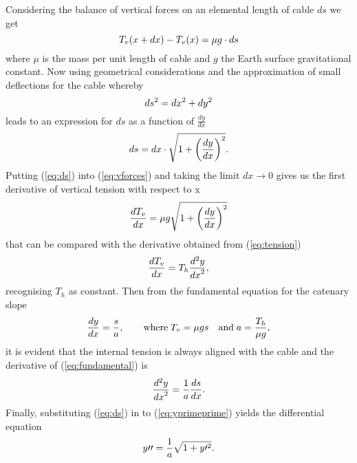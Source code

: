 \documentclass[11pt]{amsart}
\begin{document}
Considering the balance of vertical forces on an elemental length of cable $ds$ we get
\begin{equation}
	\centering
	T_{v}(x+dx) - T_{v}(x) = \mu g \cdot ds
	\label{eq:vforces}
\end{equation}
where $\mu$ is the mass per unit length of cable and $g$ the Earth surface gravitational constant. Now
using geometrical considerations and the approximation of small deflections for the cable whereby
\begin{equation}
	\centering
	ds^2=dx^2+dy^2
	\label{eq:elemental}
\end{equation}
leads to an expression for $ds$ as a function of $\frac{dy}{dx}$
\begin{equation}
	\centering
	ds = dx \cdot \sqrt{1 + \left(\frac{dy}{dx}\right)^2}.
	\label{eq:ds}
\end{equation}
Putting (\ref{eq:ds}) into (\ref{eq:vforces}) and taking the limit $dx \to 0$ gives us the first derivative of vertical tension with respect to x
\begin{equation}
	\centering
	\frac{dT_{v}}{dx} = \mu g \sqrt{1 + \left(\frac{dy}{dx}\right)^2}
	\label{eq:Tvprime}
\end{equation}
that can be compared with the derivative obtained from (\ref{eq:tension})
\begin{equation}
	\centering
	\frac{dT_{v}}{dx} = T_{h} \frac{d^{2}y}{{dx}^2},
	\label{eq:Tvprimeprime}
\end{equation}
recognising $T_h$ as constant. Then from the fundamental equation for the catenary slope
\begin{equation}
	\centering
	\frac{dy}{dx} = \frac{s}{a}, \qquad \text{where} \; T_{v}=\mu g s \quad \text{and} \; a=\frac{T_h}{\mu g},
	\label{eq:fundamental}
\end{equation}
it is evident that the internal tension is always aligned with the cable and the derivative of (\ref{eq:fundamental}) is 
\begin{equation}
	\centering
	\frac{d^{2}y}{{dx}^2}=\frac{1}{a}\frac{ds}{dx}.
	\label{eq:yprimeprime}
\end{equation}
Finally, substituting (\ref{eq:ds}) in to (\ref{eq:yprimeprime}) yields the differential equation 
\begin{equation}
	\centering
	y \prime \prime =\frac{1}{a} \sqrt{1 + y\prime ^2}.
	\label{eq:differential}
\end{equation}
\end{document}
